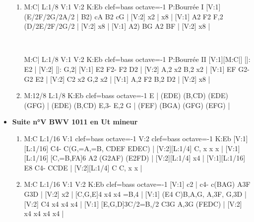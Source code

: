 \documentclass[a4paper,twoside]{article}
\begin{document}
\begin{center}
\begin{itemize}
\begin{enumerate}
  \item {}
\begin{abcsvg}
  M:C|
  L:1/8
  V:1
  V:2
  K:Eb clef=bass octave=-1
  P:Bourrée I
  [V:1] (E/2F/2G/2A/2 | B2) cA B2 cG |
  [V:2] x2 | x8 |
  [V:1] A2 F2 F,2 (D/2E/2F/2G/2 |
  [V:2] x8 |
  [V:1] A2) BG A2 BF |
  [V:2] x8 |
\end{abcsvg}
  \\
  \hspace*{\titlelen}
\begin{abcsvg}
  M:C|
  L:1/8
  V:1
  V:2
  K:Eb clef=bass octave=-1
  P:Bourrée II
  [V:1][M:C|] [|: E2 |
  [V:2] [|: G,2|
  [V:1] E2 F2- F2 D2 |
  [V:2] A,2 x2 B,2 x2 |
  [V:1] EF G2- G2 E2 |
  [V:2] C2 x2 G,2 x2 |
  [V:1] A,2 F2 B,2 D2 |
  [V:2] x8 |
\end{abcsvg}
  \makebox[2cm][l]{ \dotfill\ \pageref{IVbourrees}}
  \par\vspace{\titleseplen}

  \item {}
\begin{abcsvg}
  M:12/8
  L:1/8
  K:Eb clef=bass octave=-1
  E | (EDE) (B,CD) (EDE) (GFG) |
  (EDE) (B,CD) E,3- E,2 G |
  (FEF) (BGA) (GFG) (EFG) |
\end{abcsvg}
  \makebox[2cm][l]{ \dotfill\ \pageref{IVgigue}}
  \end{enumerate}
  \newpage
  
  \item \textbf{Suite n°V BWV 1011 en Ut mineur} \dotfill\ \pageref{SuiteV}
\begin{enumerate}
  \item {}
\begin{abcsvg}
  M:C
  L:1/16
  V:1 clef=bass octave=-1
  V:2 clef=bass octave=-1
  K:Eb
  [V:1][L:1/16] C4- C(G,=A,=B, CDEF EDEC) |
  [V:2][L:1/4]  C,  x x x |
  [V:1][L:1/16] [C,=B,FA]6 A2 (G2AF) (E2FD) |
  [V:2][L:1/4]  x4 |
  [V:1][L:1/16] E8 C4- CCDE |
  [V:2][L:1/4]  C C, x x |
\end{abcsvg}
  \makebox[2cm][l]{ \dotfill\ \pageref{Vprelude}}
  \par\vspace{\titleseplen}

  \item {}
\begin{abcsvg}
  M:C
  L:1/16
  V:1
  V:2
  K:Eb clef=bass octave=-1
  [V:1] c2 | c4- c(BAG) A3F G3D |
  [V:2] x2 | [C,G,E]4 x4 x4 =B,4 |
  [V:1] (E4 C)B,A,G, A,3F, G,3D |
  [V:2] C4 x4 x4 x4 |
  [V:1]  [E,G,D]3C/2=B,/2 C3G A,3G (FEDC) |
  [V:2] x4 x4 x4 x4 |
\end{abcsvg}
  \makebox[2cm][l]{ \dotfill\ \pageref{Vallemande}}
  \par\vspace{\titleseplen}


\end{enumerate}
\end{itemize}
\end{center}
\end{document}
